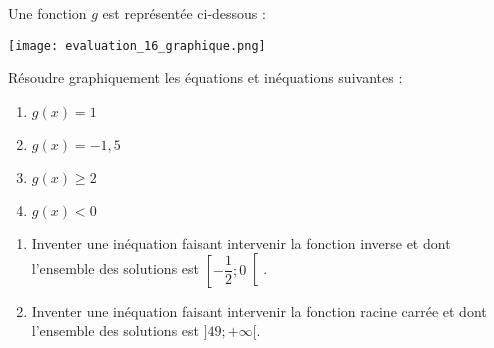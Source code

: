 \documentclass[a4paper]{article}
\begin{document}
\dotfill{}

\bigskip

\exo[4 points] Une fonction $g$ est représentée ci-dessous :

\begin{center}
  \texttt{[image: evaluation\_16\_graphique.png]}
\end{center}

Résoudre graphiquement les équations et inéquations suivantes :
\smallskip
\begin{multicols}{4}
  \begin{enumerate}
    \item $g(x)=1$
    \item $g(x)=-1,5$
    \item $g(x)\geq 2$
    \item $g(x)<0$
  \end{enumerate}
\end{multicols}

\dotfill{}

\bigskip

\exo[2 points] \vspace{-2mm}
\begin{enumerate}
  \item Inventer une inéquation faisant intervenir la fonction inverse et dont l'ensemble des solutions est $\left[-\dfrac{1}{2};0\right[$.
    \item Inventer une inéquation faisant intervenir la fonction racine carrée et dont l'ensemble des solutions est $]49;+\infty[$.
\end{enumerate}
\end{document}
